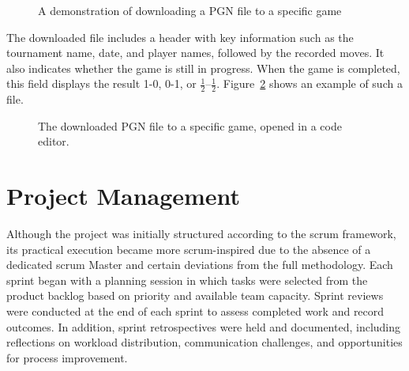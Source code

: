 \begin{figure}[h!] \centering {}\caption[Display of board view]{A demonstration of downloading a PGN file to a specific game}\label{fig:download-pgn} \end{figure}

The downloaded file includes a header with key information such as the tournament name, date, and player names, followed by the recorded moves. It also indicates whether the game is still in progress. When the game is completed, this field displays the result 1-0, 0-1, or $\frac{1}{2}$–$\frac{1}{2}$. Figure~\ref{fig:downloaded-pgn} shows an example of such a file. \\

\begin{figure}[h!] \centering {}\caption[PGN file and metadata]{The downloaded PGN file to a specific game, opened in a code editor.}\label{fig:downloaded-pgn} \end{figure}

\section{Project Management}
\label{sec:results-project-management}
Although the project was initially structured according to the \gls{scrum} framework, its practical execution became more \gls{scrum}-inspired due to the absence of a dedicated \gls{scrum} Master and certain deviations from the full methodology. Each sprint began with a planning session in which tasks were selected from the product backlog based on priority and available team capacity. Sprint reviews were conducted at the end of each sprint to assess completed work and record outcomes. In addition, sprint retrospectives were held and documented, including reflections on workload distribution, communication challenges, and opportunities for process improvement. \\

